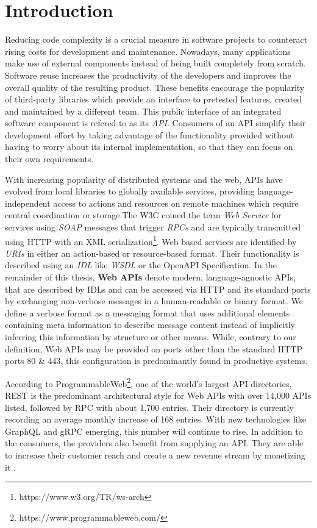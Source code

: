 \chapter{Introduction}
\label{ch:Introduction}

Reducing code complexity is a crucial measure in software projects to counteract rising costs for development and maintenance. Nowadays, many applications make use of external components instead of being built completely from scratch. Software reuse increases the productivity of the developers and improves the overall quality of the resulting product. These benefits encourage the popularity of third-party libraries which provide an interface to pretested features, created and maintained by a different team. This public interface of an integrated software component is refered to as its \textit{\ac{API}}. Consumers of an \ac{API} simplify their development effort by taking advantage of the functionality provided without having to worry about its internal implementation, so that they can focus on their own requirements. 

With increasing popularity of distributed systems and the web, APIs have evolved from local libraries to globally available services, providing language-independent access to actions and resources on remote machines which require central coordination or storage.The \ac{W3C} coined the term \textit{Web Service} for services using \textit{\ac{SOAP}} messages that trigger \textit{\acp{RPC}} and are typically transmitted using HTTP with an \acs{XML} serialization\footnote{https://www.w3.org/TR/ws-arch}. Web based services are identified by \textit{\acp{URI}} in either an action-based or resource-based format. Their functionality is described using an \textit{\ac{IDL}} like \textit{\ac{WSDL}} or the OpenAPI Specification. In the remainder of this thesis, \textbf{Web APIs} denote modern, language-agnostic \acp{API}, that are described by \acp{IDL} and can be accessed via HTTP and its standard ports by exchanging non-verbose messages in a human-readable or binary format. We define a verbose format as a messaging format that uses additional elements containing meta information to describe message content instead of implicitly inferring this information by structure or other means. While, contrary to our definition, Web APIs may be provided on ports other than the standard HTTP ports 80 \& 443, this configuration is predominantly found in productive systems.

 According to ProgrammableWeb\footnote{https://www.programmableweb.com/}, one of the world's largest \ac{API} directories, \acs{REST} is the predominant architectural style for Web APIs with over 14,000 \acp{API} listed, followed by \ac{RPC} with about 1,700 entries. Their directory is currently recording an average monthly increase of 168 entries. With new technologies like GraphQL and gRPC emerging, this number will continue to rise. In addition to the consumers, the providers also benefit from supplying an \ac{API}. They are able to increase their customer reach and create a new revenue stream by monetizing it \cite[p. 243]{koci_classification_2019}. 

